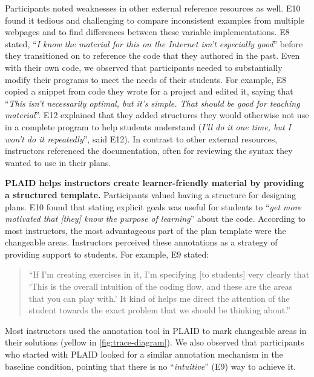 Participants noted weaknesses in other external reference resources as well. 
E10 found it tedious and challenging to compare inconsistent examples from multiple webpages and to find differences between these variable implementations. E8 stated, ``\textit{I know the material for this on the Internet isn't especially good}'' before they transitioned on to reference the code that they authored in the past. Even with their own code, we observed that participants needed to substantially modify their programs to meet the needs of their students. 
For example, E8 copied a snippet from code they wrote for a project and edited it, saying that ``\textit{This isn't necessarily optimal, but it's simple. That should be good for teaching material}''. E12 explained that they added structures they would otherwise not use in a complete program to help students understand (\textit{I'll do it one time, but I won't do it repeatedly}'', said E12). In contrast to other external resources, instructors referenced the documentation, often for reviewing the syntax they wanted to use in their plans.

 

\textbf{PLAID helps instructors create learner-friendly material by providing a structured template.}
Participants valued having a structure for designing plans. E10 found that stating explicit goals was useful for students to ``\textit{get more motivated that [they] know the purpose of learning}'' about the code. 
According to most instructors, the most advantageous part of the plan template were the changeable areas. Instructors perceived these annotations as a strategy of providing support to students. For example, E9 stated: \begin{quote}
``If I'm creating exercises in it, I'm specifying [to students] very clearly that `This is the overall intuition of the coding flow, and these are the areas that you can play with.' It kind of helps me direct the attention of the student towards the exact problem that we should be thinking about.''
\end{quote}
Most instructors used the annotation tool in PLAID to mark changeable areas in their solutions (yellow in \cref{fig:trace-diagram}). We also observed that participants who started with PLAID looked for a similar annotation mechanism in the baseline condition, pointing that there is no ``\textit{intuitive}'' (E9) way to achieve it.  

